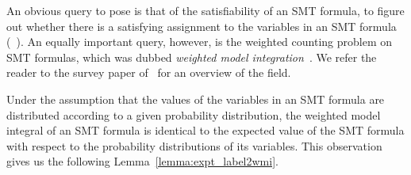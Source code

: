An obvious query to pose is that of the satisfiability of an SMT formula, \ie to figure out whether there is a satisfying assignment to the variables in an SMT formula (\eg~\citep{demoura2009z3}). An equally important query, however, is the weighted counting problem on SMT formulas, which was dubbed {\em weighted model integration}~\citep{belle2015probabilistic}.
We refer the reader to the survey paper of~\citet{morettin2021hybrid} for an overview of the field.




Under the assumption that the values of the variables in an SMT formula are distributed according to a given probability distribution, the weighted model integral of an SMT formula is identical to the expected value of the SMT formula with  respect to the probability distributions of its variables.
This observation gives us the following Lemma~\ref{lemma:expt_label2wmi}.

